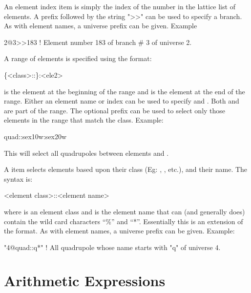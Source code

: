 An element index item is simply the index of the number in the lattice list of elements. A prefix
followed by the string ">>" can be used to specify a branch. As with element names, a universe
prefix can be given. Example
\begin{example}
  2@3>>183   ! Element number 183 of branch \# 3 of universe 2.
\end{example}

A range of elements is specified using the format:
\begin{example}
  \{<class>::\}<ele1>:<ele2>
\end{example}
 is the element at the beginning of the range and  is the element at the end
of the range. Either an element name or index can be used to specify  and
. Both  and  are part of the range. The optional 
prefix can be used to select only those elements in the range that match the class.  Example:
\begin{example}
  quad::sex10w:sex20w
\end{example}
This will select all quadrupoles between elements  and .

A  item
selects elements based upon their class (Eg: ,
, etc.), and their name. The syntax is:
\begin{example}
  <element class>::<element name>
\end{example}
where  is an element class and  is the element name that can
(and generally does) contain the wild card characters ``\%'' and ``*''. Essentially this is an
extension of the  format. As with element names, a universe prefix can be
given. Example:
\begin{example}
  "4@quad::q*"   ! All quadrupole whose name starts with "q" of universe 4.
\end{example}

\section{Arithmetic Expressions}
\label{s:arithmetic.exp}

